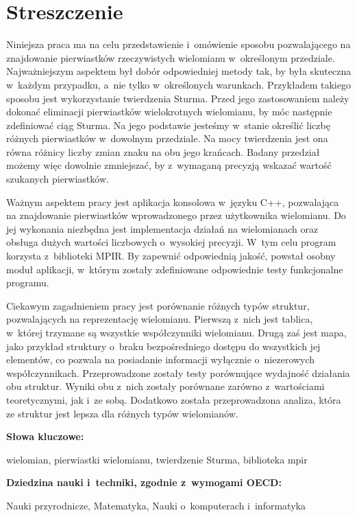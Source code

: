 \chapter*{Streszczenie}
\indent
Niniejsza praca ma na celu przedstawienie i~omówienie sposobu pozwalającego na znajdowanie pierwiastków rzeczywistych wielomianu w~określonym przedziale. Najważniejszym aspektem był dobór odpowiedniej metody tak, by była skuteczna w~każdym przypadku, a~nie tylko w~określonych warunkach. Przykładem takiego sposobu jest wykorzystanie twierdzenia Sturma. Przed jego zastosowaniem należy dokonać eliminacji pierwiastków wielokrotnych wielomianu, by móc następnie zdefiniować ciąg Sturma. Na jego podstawie jesteśmy w~stanie określić liczbę różnych pierwiastków w~dowolnym przedziale.  Na mocy twierdzenia jest ona równa różnicy liczby zmian znaku na obu jego krańcach. Badany przedział możemy więc dowolnie zmniejszać, by z~wymaganą precyzją wskazać wartość szukanych pierwiastków.

Ważnym aspektem pracy jest aplikacja konsolowa w~języku C++, pozwalająca na znajdowanie pierwiastków wprowadzonego przez użytkownika wielomianu. Do jej wykonania niezbędna jest implementacja działań na wielomianach oraz obsługa dużych wartości liczbowych o~wysokiej precyzji. W~tym celu program korzysta z~biblioteki MPIR. By zapewnić odpowiednią jakość, powstał osobny moduł aplikacji, w~którym zostały zdefiniowane odpowiednie testy funkcjonalne programu.

Ciekawym zagadnieniem pracy jest porównanie różnych typów struktur, pozwalających na reprezentację wielomianu. Pierwszą z~nich jest tablica, w~której trzymane są wszystkie współczynniki wielomianu. Drugą zaś jest mapa, jako przykład struktury o~braku bezpośredniego dostępu do wszystkich jej elementów, co pozwala na posiadanie informacji wyłącznie o~niezerowych współczynnikach. Przeprowadzone zostały testy porównujące wydajność działania obu struktur. Wyniki obu z~nich zostały porównane zarówno z~wartościami teoretycznymi, jak i~ze sobą. Dodatkowo została przeprowadzona analiza, która ze struktur jest lepsza dla różnych typów wielomianów.

\vspace{12pt}
\noindent\textbf{Słowa kluczowe:}

wielomian, pierwiastki wielomianu, twierdzenie Sturma, biblioteka mpir

\vspace{12pt}
\noindent\textbf{Dziedzina nauki i~techniki, zgodnie z~wymogami OECD:}

Nauki przyrodnicze, Matematyka, Nauki o~komputerach i~informatyka
